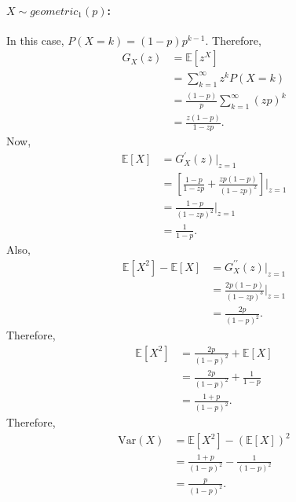 \paragraph{$X \sim geometric_1(p)$:} In this case, $P(X=k) = (1-p)p^{k-1}$. Therefore,
\begin{align*}
	G_X(z) &= \mathbb{E}[z^X]\\
	&= \sum_{k=1}^{\infty} z^k P(X=k)\\
	&= \frac{(1-p)}{p}\sum_{k=1}^{\infty}(zp)^k\\
	&= \frac{z(1-p)}{1-zp}.
\end{align*}
Now,
\begin{align*}
	\mathbb{E}[X] &= G_X^{\prime}(z)|_{z=1}\\
	&= \left[\frac{1-p}{1-zp} + \frac{zp(1-p)}{(1-zp)^2}\right]\Big|_{z=1}\\
	&= \frac{1-p}{(1-zp)^2}\Big|_{z=1}\\
	&= \frac{1}{1-p}.
\end{align*}
Also,
\begin{align*}
	\mathbb{E}[X^2]-\mathbb{E}[X] &= G_X^{\prime\prime}(z)|_{z=1}\\
	&= \frac{2p(1-p)}{(1-zp)^3}\Big|_{z=1}\\
	&= \frac{2p}{(1-p)^2}.
\end{align*}
Therefore,
\begin{align*}
	\mathbb{E}[X^2] &= \frac{2p}{(1-p)^2} + \mathbb{E}[X]\\
	&= \frac{2p}{(1-p)^2} + \frac{1}{1-p}\\
	&= \frac{1+p}{(1-p)^2}.
\end{align*}
Therefore,
\begin{align*}
	\text{Var}(X) &= \mathbb{E}[X^2] - (\mathbb{E}[X])^2\\
	&= \frac{1+p}{(1-p)^2} - \frac{1}{(1-p)^2}\\
	&= \frac{p}{(1-p)^2}.
\end{align*}
